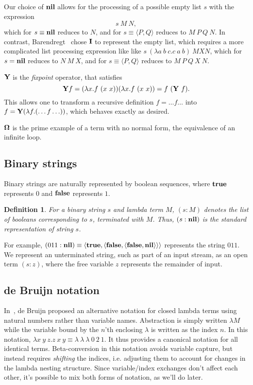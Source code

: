 \documentclass{article}
\newtheorem{definition}{Definition}
\newcommand{\tup}[1]{\langle #1 \rangle}
\newcommand{\pref}[2]{(#1:#2)}
\newcommand{\Ct}{{\bf true}}
\newcommand{\Cf}{{\bf false}}
\newcommand{\CY}{{\bf Y}}
\newcommand{\CI}{{\bf I}}
\newcommand{\COm}{{\bf \Omega}}
\newcommand{\Cnil}{{\bf nil}}
\newcommand{\Cnull}{{\bf null}}
\begin{document}
Our choice of $\Cnil$ allows for the processing
of a possible empty list $s$ with the expression
\[ s\ M\  N, \]
which for $s\equiv \Cnil$ reduces to $N$, and for
$s\equiv \tup{P,Q}$ reduces to $M\ P\ Q\ N$.
In contrast, Barendregt~\cite{baay} chose $\CI$ to represent the empty list,
which requires a more complicated list processing expression like
like $s\ (\lambda a\ b\ c.c\ a\ b)\ M X N$,
which for $s= \Cnil$ reduces to $N\ M\ X$, and for
$s\equiv \tup{P,Q}$ reduces to $M\ P\ Q\ X\ N$.

$\CY$ is the {\em fixpoint} operator, that
satisfies \[\CY f = (\lambda x.f\ (x\ x))(\lambda x.f\ (x\ x)) = f\ (\CY\ f).\]
This allows one to transform a recursive definition $f= \ldots f \ldots$
into $f = \CY(\lambda f. (\ldots f \ldots))$, which behaves exactly as desired.

$\COm$ is the prime example of a term with no normal form, the equivalence
of an infinite loop.

\subsection{Binary strings}
Binary strings are naturally represented by boolean sequences,
where $\Ct$ represents $0$ and $\Cf$ represents $1$.
\begin{definition}
For a binary string $s$ and lambda term $M$, $\pref{s}{M}$ denotes the
list of booleans corresponding to $s$, terminated with $M$.
Thus, $\pref{s}{\Cnil}$ is the standard representation of string $s$.
\end{definition}
For example, $\pref{011}{\Cnil} \equiv \tup{\Ct,\tup{\Cf,\tup{\Cf,\Cnil}}}$
represents the string $011$.
We represent an unterminated string, such as part of an input stream,
as an open term $\pref{s}{z}$, where the free variable $z$ represents the remainder of input.

\subsection{de Bruijn notation}
In~\cite{bruijn}, de Bruijn proposed an alternative notation for closed
lambda terms using natural numbers rather than variable names.
Abstraction is simply written
$\lambda M$ while the variable bound by the $n$'th enclosing
$\lambda$ is written as the index $n$. In this notation,
$\lambda x\ y\ z.z\ x\ y \equiv \lambda\ \lambda\ \lambda\ 0\ 2\ 1$.
It thus provides a canonical notation for all identical terms.
Beta-conversion in this notation avoids variable capture,
but instead requires {\em shifting} the indices, i.e. adjusting them
to account for changes in the lambda nesting structure.
Since variable/index exchanges don't affect each other,
it's possible to mix both forms of notation, as we'll do later.
\end{document}
